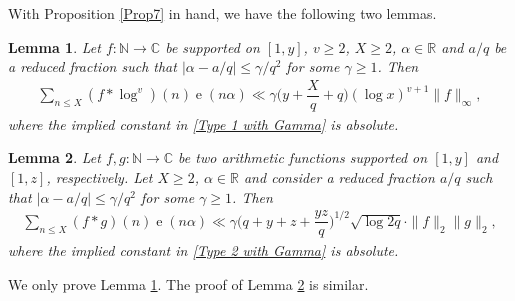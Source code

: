 \documentclass[11pt]{amsart}
\numberwithin{equation}{section}
\numberwithin{figure}{section}
\newtheorem{lemma}{Lemma}[section]
\theoremstyle{definition}
\newcommand{\e}{\operatorname{e}}
\begin{document}
With Proposition \ref{Prop7} in hand, we have the following two lemmas.

\begin{lemma}\label{lem5}
Let $f\colon \mathbb{N}\to \mathbb{C}$ be supported on $[1, y]$, $v\geqslant 2$, $X\geqslant 2$, $\alpha\in \mathbb{R}$ and $a/q$ be a reduced fraction such that $|\alpha-a/q|\leqslant\gamma/q^2$ for some $\gamma \geqslant 1$. Then
\begin{align}\label{Type 1 with Gamma}
    \sum_{n\leqslant X}(f*\log^v)(n)\e(n\alpha)\ll \gamma \bigg(y + \dfrac{X}{q}+q\bigg)(\log x)^{v+1}\|f\|_{\infty},
\end{align}
where the implied constant in \eqref{Type 1 with Gamma} is absolute.
\end{lemma}

\begin{lemma}\label{lem6}
Let $f, g\colon \mathbb{N}\to \mathbb{C}$ be two arithmetic functions supported on $[1, y]$ and $[1, z]$, respectively. Let $X\geqslant 2$, $\alpha\in \mathbb{R}$ and consider a reduced fraction $a/q$ such that $|\alpha-a/q|\leqslant\gamma/q^2$ for some $\gamma \geqslant 1$. Then
\begin{align}\label{Type 2 with Gamma}
    \sum_{n\leqslant X}(f*g)(n)\e(n\alpha)\ll \gamma \bigg(q + y +z + \dfrac{yz}{q}\bigg)^{1/2}\sqrt{\log 2q}\cdot \|f\|_2\|g\|_2,
\end{align}
where the implied constant in \eqref{Type 2 with Gamma} is absolute.
\end{lemma}
We only prove Lemma \ref{lem5}. The proof of Lemma \ref{lem6} is similar.
\end{document}
